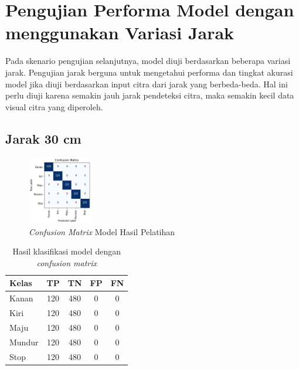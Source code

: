 \section{Pengujian Performa Model dengan menggunakan Variasi Jarak}

Pada skenario pengujian selanjutnya, model diuji berdasarkan beberapa variasi jarak. Pengujian jarak berguna untuk mengetahui performa dan tingkat akurasi model jika diuji berdasarkan input citra dari jarak yang berbeda-beda. Hal ini perlu diuji karena semakin jauh jarak pendeteksi citra, maka semakin kecil data visual citra yang diperoleh.

\subsection{Jarak 30 cm}

\begin{figure} [ht] \centering
  \includegraphics[width=0.25\textwidth]{gambar/bab4/model5 (30cm)/matrix.png}
  \caption{\emph{Confusion Matrix} Model Hasil Pelatihan}
  \label{fig:matrix2}
\end{figure}

\begin{longtable}{|l|c|c|c|c|}
  \caption{Hasil klasifikasi model dengan \emph{confusion matrix}}
  \label{tb:cm_model2} \\
  \hline
  \rowcolor[HTML]{C0C0C0} 
  \textbf{Kelas} & \textbf{TP} & \textbf{TN} & \textbf{FP} & \textbf{FN} \\ \hline
  Kanan    & 120          & 480         & 0           & 0           \\ \hline
  Kiri      & 120          & 480         & 0           & 0           \\ \hline
  Maju      & 120          & 480         & 0           & 0           \\ \hline
  Mundur     & 120          & 480         & 0           & 0           \\ \hline
  Stop  & 120          & 480         & 0           & 0           \\ \hline
\end{longtable}

